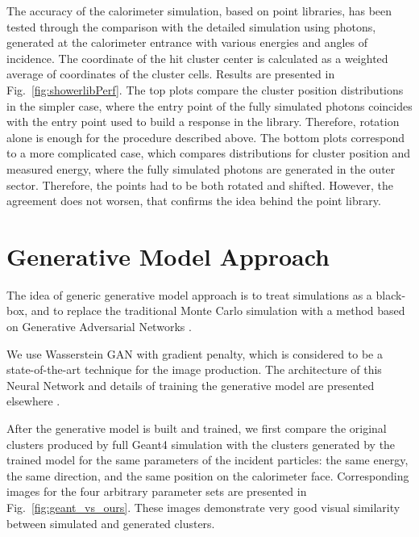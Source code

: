 \documentclass{PoS}
\begin{document}
The accuracy of the calorimeter simulation, based on point libraries,
has been tested through the comparison with the detailed simulation using
photons, generated at the calorimeter entrance with various energies
and angles of incidence. The coordinate of the hit cluster center is
calculated as a weighted average of coordinates of the cluster cells. 
Results are presented in Fig.~\ref{fig:showerlibPerf}.
The top plots compare the cluster position distributions in the simpler case,
where the entry point of the fully simulated photons coincides with
the entry point used to build a response in the library. Therefore, rotation alone is enough for the procedure described above.
The bottom plots correspond to a more complicated case, which compares distributions for cluster position and
measured energy, where the fully simulated photons are
generated in the outer sector. 
Therefore, the points had to be both rotated and shifted. However, the agreement does not worsen, that confirms the idea behind the point library.

\section {Generative Model Approach}
The idea of generic generative model approach  is to treat simulations as a black-box, and
to replace the traditional Monte Carlo simulation with a method based on
Generative Adversarial Networks \cite{gan}. 

We use Wasserstein GAN \cite{wgan}
with gradient penalty, which is considered to be a state-of-the-art technique
for the image production. The architecture of this Neural Network and details of training
the generative model are presented elsewhere \cite{chepGAN}.

After the generative model is built and trained,
we first compare the original clusters produced by full Geant4
simulation with the clusters generated by the trained model for the same
parameters of the incident particles: the same energy, the same
direction, and the same position on the calorimeter 
face. Corresponding images for the four arbitrary parameter sets are
presented in Fig.~\ref{fig:geant_vs_ours}. These images demonstrate very good visual similarity between simulated and generated clusters.
\end{document}
